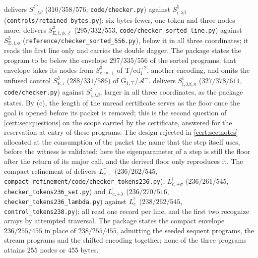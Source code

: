  delivers $S^{\natural\prime\prime}_{\mathrm{i},\lambda\beta}$ ($310/358/576$,
\texttt{code/checker.py}) against $S^{\natural}_{\mathrm{i},\lambda\beta}$
(\texttt{controls/retained\_bytes.py}): six bytes fewer, one token and three nodes more.
 delivers $S^{3}_{\mathrm{E,i},\phi,\ell}$ ($295/332/553$,
\texttt{code/checker\_sorted\_line.py}) against $S^{3}_{\mathrm{E,i},\phi}$
(\texttt{reference/checker\_sorted\_556.py}), below it in all three coordinates; it reads the first
line only and carries the double dagger. The package states the program to be below the envelope
$297/335/556$ of the sorted programs; that envelope takes its nodes from $S^{3}_{\mathrm{e,m},+}$ of
T/ed$_1^{+2}$, another encoding, and omits the unfused control $S^{3}_{\mathrm{E,i}}$
($288/331/586$) of G$_{1,\top}$/$\mathcal A^{-}$.  delivers
$S^{\natural}_{\mathrm{i},\lambda\beta,\kappa}$ ($327/378/611$, \texttt{code/checker.py}) against
$S^{\natural}_{\mathrm{i},\lambda\beta}$, larger in all three coordinates, as the package states. By
(c), the length of the unread certificate serves as the floor once the goal is opened before its
packet is removed; this is the second question of \cref{cert:sec:questions} on the scope carried by
the certificate, answered for the reservation at entry of these programs. The design rejected in
\cref{cert:sec:notes} allocated at the consumption of the packet the name that the step itself uses,
before the witness is validated; here the eigenparameter of a step is still the floor after the
return of its major call, and the derived floor only reproduces it. The compact refinement of
 delivers $L^{\vdash}_{\mathrm{c},+}$ ($236/262/545$,
\texttt{compact\_refinement/code/checker\_tokens236.py}), $L^{\vdash}_{\mathrm{c},+\sigma}$
($236/261/545$, \texttt{checker\_tokens236\_set.py}) and $L^{\vdash}_{\mathrm{c},+\lambda}$
($236/270/516$, \texttt{checker\_tokens236\_lambda.py}) against $L^{\vdash}_{\mathrm c}$
($238/262/545$, \texttt{control\_tokens238.py}); all read one record per line, and the first two
recognize arrays by attempted traversal. The package states the compact envelope $236/255/455$
in place of $238/255/455$, admitting the seeded sequent programs, the stream programs and the shifted
encoding together; none of the three programs attains $255$ nodes or $455$ bytes.

